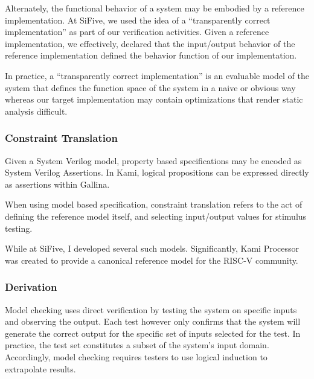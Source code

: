 \documentclass[10pt,a4paper]{article}
\begin{document}
Alternately, the functional behavior of a system may be embodied by a reference implementation. At SiFive, we used the idea of a “transparently correct implementation” as part of our verification activities. Given a reference implementation, we effectively, declared that the input/output behavior of the reference implementation defined the behavior function of our implementation.

In practice, a “transparently correct implementation” is an evaluable model of the system that defines the function space of the system in a naive or obvious way whereas our target implementation may contain optimizations that render static analysis difficult.


\subsubsection{Constraint Translation}

Given a System Verilog model, property based specifications may be encoded as System Verilog Assertions. In Kami, logical propositions can be expressed directly as assertions within Gallina.

When using model based specification, constraint translation refers to the act of defining the reference model itself, and selecting input/output values for stimulus testing.

While at SiFive, I developed several such models. Significantly, Kami Processor was created to provide a canonical reference model for the RISC-V community. 

\subsubsection{Derivation}

Model checking uses direct verification by testing the system on specific inputs and observing the output. Each test however only confirms that the system will generate the correct output for the specific set of inputs selected for the test. In practice, the test set constitutes a subset of the system's input domain. Accordingly, model checking requires testers to use logical induction to extrapolate results.
\end{document}
